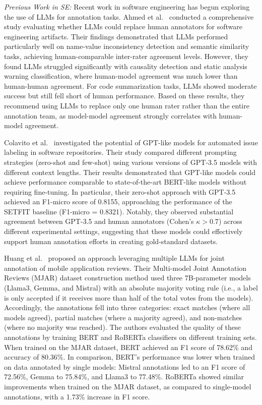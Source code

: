 \documentclass[11pt]{article}
\begin{document}
\emph{Previous Work in SE:} Recent work in software engineering has begun exploring the use of LLMs for annotation tasks. 
Ahmed et al.~\cite{DBLP:journals/corr/abs-2408-05534} conducted a comprehensive study evaluating whether LLMs could replace human annotators for software engineering artifacts.
Their findings demonstrated that LLMs performed particularly well on name-value inconsistency detection and semantic similarity tasks, achieving human-comparable inter-rater agreement levels. 
However, they found LLMs struggled significantly with causality detection and static analysis warning classification, where human-model agreement was much lower than human-human agreement. 
For code summarization tasks, LLMs showed moderate success but still fell short of human performance. 
Based on these results, they recommend using LLMs to replace only one human rater rather than the entire annotation team, as model-model agreement strongly correlates with human-model agreement.

Colavito et al.~\cite{DBLP:conf/msr/ColavitoLNQ24} investigated the potential of GPT-like models for automated issue labeling in software repositories. 
Their study compared different prompting strategies (zero-shot and few-shot) using various versions of GPT-3.5 models with different context lengths. 
Their results demonstrated that GPT-like models could achieve performance comparable to state-of-the-art BERT-like models without requiring fine-tuning. 
In particular, their zero-shot approach with GPT-3.5 achieved an F1-micro score of 0.8155, approaching the performance of the SETFIT baseline (F1-micro = 0.8321). 
Notably, they observed substantial agreement between GPT-3.5 and human annotators (Cohen's $\kappa > 0.7$) across different experimental settings, suggesting that these models could effectively support human annotation efforts in creating gold-standard datasets.

Huang et al.~\cite{Huang2023Enhancing} proposed an approach leveraging multiple LLMs for joint annotation of mobile application reviews. 
Their Multi-model Joint Annotation Reviews (MJAR) dataset construction method used three 7B-parameter models (Llama3, Gemma, and Mistral) with an absolute majority voting rule (i.e., a label is only accepted if it receives more than half of the total votes from the models). 
Accordingly, the annotations fell into three categories: exact matches (where all models agreed), partial matches (where a majority agreed), and non-matches (where no majority was reached). 
The authors evaluated the quality of these annotations by training BERT and RoBERTa classifiers on different training sets. 
When trained on the MJAR dataset, BERT achieved an F1 score of 78.62\% and accuracy of 80.36\%. 
In comparison, BERT's performance was lower when trained on data annotated by single models: Mistral annotations led to an F1 score of 72.56\%, Gemma to 75.84\%, and Llama3 to 77.48\%.
RoBERTa showed similar improvements when trained on the MJAR dataset, as compared to single-model annotations, with a 1.73\% increase in F1 score.
\end{document}
